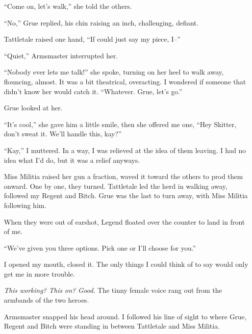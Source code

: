 ``Come on, let's walk,'' she told the others.



``No,'' Grue replied, his chin raising an inch, challenging, defiant.



Tattletale raised one hand, ``If  could just say my piece, I--''



``Quiet,'' Armsmaster interrupted her.



``Nobody ever lets me talk!'' she spoke, turning on her heel to walk away, flouncing, almost.  It was a bit theatrical, overacting.  I wondered if someone that didn't know her would catch it.  ``Whatever.  Grue, let's go.''



Grue looked at her.



``It's cool,'' she gave him a little smile, then she offered me one, ``Hey Skitter, don't sweat it.  We'll handle this, kay?''



``Kay,'' I muttered.  In a way, I was relieved at the idea of them leaving.  I had no idea what I'd do, but it was a relief anyways.



Miss Militia raised her gun a fraction, waved it toward the others to prod them onward.  One by one, they turned.  Tattletale led the herd in walking away, followed my Regent and Bitch.  Grue was the last to turn away, with Miss Militia following him.



When they were out of earshot, Legend floated over the counter to land in front of me.



``We've given you three options.  Pick one or I'll choose for you.''



I opened my mouth, closed it.  The only things I could think of to say would only get me in more trouble.



\emph{This working?  This on?  Good.  }The tinny female voice rang out from the armbands of the two heroes.



Armsmaster snapped his head around.\emph{  }I followed his line of sight to where Grue, Regent and Bitch were standing in between Tattletale and Miss Militia.




